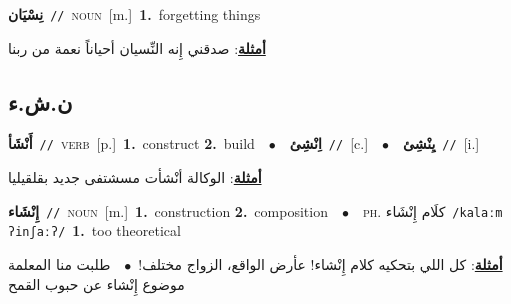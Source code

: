 \documentclass[10pt,a4paper,twoside]{article} %
\begin{document}
\begin{multicols}{2}
{\setlength\topsep{0pt}\textbf{\foreignlanguage{arabic}{نِسْيَان}}\ {\color{gray}\texttt{//}\color{black}}\ \textsc{noun}\ [m.]\ \textbf{1.}~forgetting things\  \begin{flushright}\color{gray}\foreignlanguage{arabic}{\textbf{\underline{\foreignlanguage{arabic}{أمثلة}}}: صدقني إِنه النِّسيان أحياناً نعمة من ربنا}\end{flushright}\color{black}} \vspace{2mm}

\vspace{-3mm}
\subsection*{\color{blue}\foreignlanguage{arabic}{ن.ش.ء}\color{blue}{}} 

{\setlength\topsep{0pt}\textbf{\foreignlanguage{arabic}{أَنْشَأ}}\ {\color{gray}\texttt{//}\color{black}}\ \textsc{verb}\ [p.]\ \textbf{1.}~construct  \textbf{2.}~build\ \ $\bullet$\ \ \setlength\topsep{0pt}\textbf{\foreignlanguage{arabic}{اِنْشِئ}}\ {\color{gray}\texttt{//}\color{black}}\ [c.]\ \ $\bullet$\ \ \setlength\topsep{0pt}\textbf{\foreignlanguage{arabic}{يِنْشِئ}}\ {\color{gray}\texttt{//}\color{black}}\ [i.]\  \begin{flushright}\color{gray}\foreignlanguage{arabic}{\textbf{\underline{\foreignlanguage{arabic}{أمثلة}}}: الوكالة أنْشأت مسشتفى جديد بقلقيليا}\end{flushright}\color{black}} \vspace{2mm}

{\setlength\topsep{0pt}\textbf{\foreignlanguage{arabic}{إِنْشَاء}}\ {\color{gray}\texttt{//}\color{black}}\ \textsc{noun}\ [m.]\ \textbf{1.}~construction  \textbf{2.}~composition\ \ $\bullet$\ \ \textsc{ph.} \color{gray} \foreignlanguage{arabic}{كلَام إِنْشَاء}\color{black}\ {\color{gray}\texttt{/{\sffamily kalaːm ʔinʃaːʔ}/}\color{black}}\ \textbf{1.}~too theoretical\  \begin{flushright}\color{gray}\foreignlanguage{arabic}{\textbf{\underline{\foreignlanguage{arabic}{أمثلة}}}: كل اللي بتحكيه كلام إِنْشاء! عأرض الواقع، الزواج مختلف!\ $\bullet$\ \  طلبت منا المعلمة موضوع إِنْشاء عن حبوب القمح}\end{flushright}\color{black}} \vspace{2mm}


\end{multicols}
\end{document}
